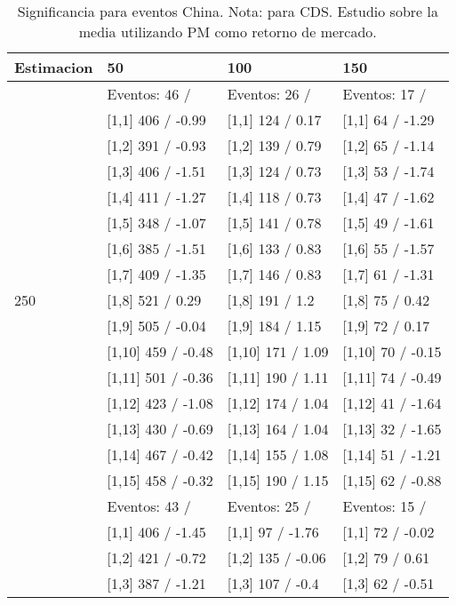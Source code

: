 \begin{table}

\caption{Significancia para eventos China. Nota: para CDS. Estudio sobre la media utilizando PM como retorno de mercado.}
\centering
\begin{tabular}[t]{llll}
\toprule
Estimacion & 50 & 100 & 150\\
\midrule
 & Eventos:  46 / & Eventos:  26 / & Eventos:  17 /\\
 & {}[1,1] 406  / -0.99 & {}[1,1] 124  / 0.17 & {}[1,1] 64  / -1.29\\
 & {}[1,2] 391  / -0.93 & {}[1,2] 139  / 0.79 & {}[1,2] 65  / -1.14\\
 & {}[1,3] 406  / -1.51 & {}[1,3] 124  / 0.73 & {}[1,3] 53  / -1.74\\
 & {}[1,4] 411  / -1.27 & {}[1,4] 118  / 0.73 & {}[1,4] 47  / -1.62\\
\addlinespace
 & {}[1,5] 348  / -1.07 & {}[1,5] 141  / 0.78 & {}[1,5] 49  / -1.61\\
 & {}[1,6] 385  / -1.51 & {}[1,6] 133  / 0.83 & {}[1,6] 55  / -1.57\\
 & {}[1,7] 409  / -1.35 & {}[1,7] 146  / 0.83 & {}[1,7] 61  / -1.31\\
250 & {}[1,8] 521  / 0.29 & {}[1,8] 191  / 1.2 & {}[1,8] 75  / 0.42\\
 & {}[1,9] 505  / -0.04 & {}[1,9] 184  / 1.15 & {}[1,9] 72  / 0.17\\
\addlinespace
 & {}[1,10] 459  / -0.48 & {}[1,10] 171  / 1.09 & {}[1,10] 70  / -0.15\\
 & {}[1,11] 501  / -0.36 & {}[1,11] 190  / 1.11 & {}[1,11] 74  / -0.49\\
 & {}[1,12] 423  / -1.08 & {}[1,12] 174  / 1.04 & {}[1,12] 41  / -1.64\\
 & {}[1,13] 430  / -0.69 & {}[1,13] 164  / 1.04 & {}[1,13] 32  / -1.65\\
 & {}[1,14] 467  / -0.42 & {}[1,14] 155  / 1.08 & {}[1,14] 51  / -1.21\\
\addlinespace
 & {}[1,15] 458  / -0.32 & {}[1,15] 190  / 1.15 & {}[1,15] 62  / -0.88\\
 & Eventos:  43 / & Eventos:  25 / & Eventos:  15 /\\
 & {}[1,1] 406  / -1.45 & {}[1,1] 97  / -1.76 & {}[1,1] 72  / -0.02\\
 & {}[1,2] 421  / -0.72 & {}[1,2] 135  / -0.06 & {}[1,2] 79  / 0.61\\
 & {}[1,3] 387  / -1.21 & {}[1,3] 107  / -0.4 & {}[1,3] 62  / -0.51\\

\end{tabular}
\end{table}
